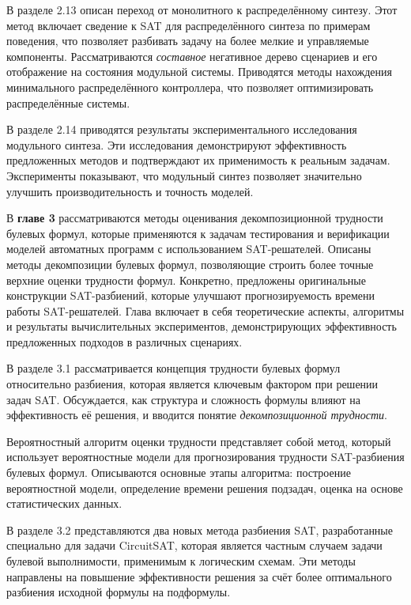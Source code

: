 В разделе 2.13 описан переход от монолитного к распределённому синтезу.
Этот метод включает сведение к SAT для распределённого синтеза по примерам поведения, что позволяет разбивать задачу на более мелкие и управляемые компоненты.
Рассматриваются \textit{составное} негативное дерево сценариев и его отображение на состояния модульной системы.
Приводятся методы нахождения минимального распределённого контроллера, что позволяет оптимизировать распределённые системы.

В разделе 2.14 приводятся результаты экспериментального исследования модульного синтеза.
Эти исследования демонстрируют эффективность предложенных методов и подтверждают их применимость к реальным задачам.
Эксперименты показывают, что модульный синтез позволяет значительно улучшить производительность и точность моделей.


В \textbf{главе 3} рассматриваются методы оценивания декомпозиционной трудности булевых формул, которые применяются к задачам тестирования и верификации моделей автоматных программ с использованием SAT-решателей.
Описаны методы декомпозиции булевых формул, позволяющие строить более точные верхние оценки трудности формул.
Конкретно, предложены оригинальные конструкции SAT-разбиений, которые улучшают прогнозируемость времени работы SAT-решателей.
Глава включает в себя теоретические аспекты, алгоритмы и результаты вычислительных экспериментов, демонстрирующих эффективность предложенных подходов в различных сценариях.

В разделе 3.1 рассматривается концепция трудности булевых формул относительно разбиения, которая является ключевым фактором при решении задач SAT.
Обсуждается, как структура и сложность формулы влияют на эффективность её решения, и вводится понятие \textit{декомпозиционной трудности}.

Вероятностный алгоритм оценки трудности представляет собой метод, который использует вероятностные модели для прогнозирования трудности SAT-разбиения булевых формул. Описываются основные этапы алгоритма: построение вероятностной модели, определение времени решения подзадач, оценка на основе статистических данных.

В разделе 3.2 представляются два новых метода разбиения SAT, разработанные специально для задачи CircuitSAT, которая является частным случаем задачи булевой выполнимости, применимым к логическим схемам.
Эти методы направлены на повышение эффективности решения за счёт более оптимального разбиения исходной формулы на подформулы.

